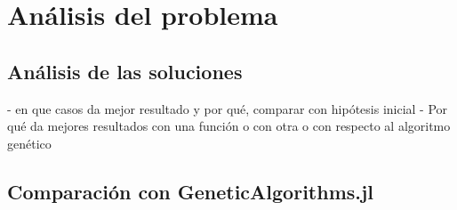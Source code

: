 \chapter{Análisis del problema}






\section{Análisis de las soluciones}

- en que casos da mejor resultado y por qué, comparar con hipótesis inicial
- Por qué da mejores resultados con una función o con otra o con respecto al algoritmo genético


\section{Comparación con GeneticAlgorithms.jl}
